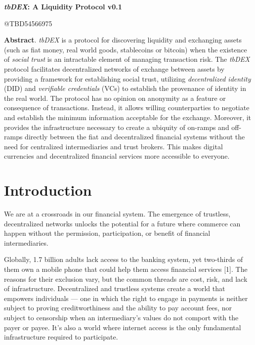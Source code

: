 \documentclass[11pt]{article}
\begin{document}
\begin{center}
{\LARGE \textbf{\textit{tbDEX}: A Liquidity Protocol v0.1}}
\end{center}


\vspace{1\baselineskip}
\begin{center}
{\large \textcolor[HTML]{999999}{@TBD54566975}}
\end{center}


\vspace{2\baselineskip}
\textbf{Abstract}. \textit{tbDEX} is a protocol for discovering liquidity and exchanging assets (such as fiat money, real world goods, stablecoins or bitcoin)\textcolor[HTML]{202124}{ }when the existence of \textit{social trust} is an intractable element of managing transaction risk. The \textit{tbDEX} protocol facilitates decentralized networks of exchange between assets by providing a framework for establishing social trust, utilizing \textit{decentralized identity} (DID) and \textit{verifiable credentials }(VCs) to establish the provenance of identity in the real world. The protocol has no opinion on anonymity as a feature or consequence of transactions. Instead, it allows willing counterparties to negotiate and establish the minimum information acceptable for the exchange. Moreover, it provides the infrastructure necessary to create a ubiquity of on-ramps and off-ramps directly between the fiat and decentralized financial systems without the need for centralized intermediaries and trust brokers. This makes digital currencies and decentralized financial services more accessible to everyone.

\vspace{1\baselineskip}
\section{Introduction}

\vspace{1\baselineskip}
We are at a crossroads in our financial system. The emergence of trustless, decentralized networks unlocks the potential for a future where commerce can happen without the permission, participation, or benefit of financial intermediaries. 

\vspace{1\baselineskip}
Globally, 1.7 billion adults lack access to the banking system, yet two-thirds of them own a mobile phone that could help them access financial services [1]. The reasons for their exclusion vary, but the common threads are cost, risk, and lack of infrastructure. Decentralized and trustless systems create a world that empowers individuals \textcolor[HTML]{202124}{— one in which }the right to engage in payments is neither subject to proving creditworthiness and the ability to pay account fees, nor subject to censorship when an intermediary’s values do not comport with the payer or payee. It’s also a world where internet access is the only fundamental infrastructure required to participate.\ \ 
\end{document}
